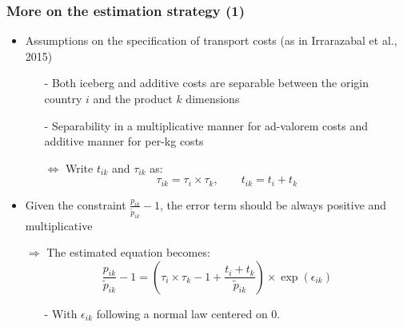 \documentclass[10 pt,Helvetica, french]{beamer}
\begin{document}
\begin{frame}[label=app_method_1]
\frametitle{More on the estimation strategy (1)}
\begin{itemize}
\item Assumptions on the specification of transport costs (as in Irrarazabal et al., 2015) \vspace{0.1cm}
\begin{itemize}
\item[-] Both iceberg and additive costs are separable between the origin country $i$ and the product $k$ dimensions \vspace{0.1cm}
\item[-] Separability in a multiplicative manner for ad-valorem costs and additive manner for per-kg costs \vspace{0.1cm}
\item[$\Leftrightarrow$] Write $t_{ik}$ and $\tau_{ik}$ as:
\begin{equation}
 \tau_{ik} = \tau_{i} \times \tau_{k}, \qquad t_{ik} = t_{i} + t_{k} \label{eq:specifTC}
 \end{equation}
\end{itemize}
\item Given the constraint $\frac{p_{ik}}{\widetilde{p}_{ik}} -1$, the error term should be always positive and multiplicative \vspace{0.1cm}
\item[$\Rightarrow$] The estimated equation becomes:
$$\frac{p_{ik}}{\widetilde{p}_{ik}}-1 =\left(\tau_{i} \times \tau_{k} -1+\frac{t_{i} + t_{k}}{\widetilde{p}_{ik}} \right)\times \exp(\epsilon_{ik})$$
\begin{itemize}
\item[-] With $\epsilon_{ik}$ following a normal law centered on 0.
\end{itemize}
\end{itemize}
\hyperlink{slide_method}{}
\end{frame}
\end{document}
